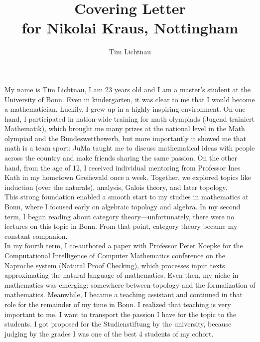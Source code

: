 \documentclass[12pt,headings=small,paper=A4,DIV=calc]{article}
\title{Covering Letter \\  for Nikolai Kraus, Nottingham}
\author{Tim Lichtnau}
\begin{document}
\maketitle
My name is Tim Lichtnau, I am 23 years old and I am a master's student at the University of Bonn. Even in kindergarten, it was clear to me that I would become a mathematician. Luckily, I grew up in a highly inspiring environment. On one hand, I participated in nation-wide training for math olympiads (Jugend trainiert Mathematik), which brought me many prizes at the national level in the Math olympiad and the Bundeswettbewerb, but more importantly it showed me that math is a team sport: JuMa taught me to discuss mathematical ideas with people across the country and make friends sharing the same passion. On the other hand, from the age of 12, I received individual mentoring from Professor Ines Kath in my hometown Greifswald once a week. Together, we explored topics like induction (over the naturals), analysis, Galois theory, and later topology. \\

This strong foundation enabled a smooth start to my studies in mathematics at Bonn, where I focused early on algebraic topology and algebra. In my second term, I began reading about category theory---unfortunately, there were no lectures on this topic in Bonn. From that point, category theory became my constant companion. \\
In my fourth term, I co-authored a \href{https://ceur-ws.org/Vol-3377/natfom2.pdf}{paper} with Professor Peter Koepke for the Computational Intelligence of Computer Mathematics conference on the Naproche system (Natural Proof Checking), which processes input texts approximating the natural language of mathematics. Even then, my niche in mathematics was emerging: somewhere between topology and the formalization of mathematics. Meanwhile, I became a teaching assistant and continued in that role for the remainder of my time in Bonn. I realized that teaching is very important to me. I want to transport the passion I have for the topic to the students. I got proposed for the Studienstiftung by the university, because judging by the grades I was one of the best 4 students of my cohort.  \\
\end{document}
